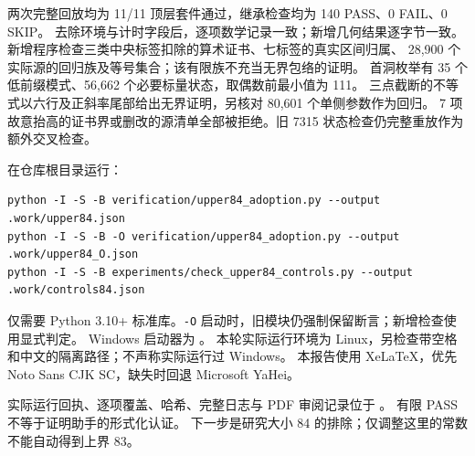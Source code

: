 \documentclass[11pt,a4paper]{article}
\begin{document}
两次完整回放均为 11/11 顶层套件通过，继承检查均为 140 PASS、0 FAIL、0 SKIP。
去除环境与计时字段后，逐项数学记录一致；新增几何结果逐字节一致。
新增程序检查三类中央标签扣除的算术证书、七标签的真实区间归属、
28,900 个实际源的回归族及等号集合；该有限族不充当无界包络的证明。
首洞枚举有 35 个低前缀模式、56,662 个必要标量状态，取偶数前最小值为 111。
三点截断的不等式以六行及正斜率尾部给出无界证明，另核对 80,601 个单侧参数作为回归。
7 项故意抬高的证书界或删改的源清单全部被拒绝。旧 7315 状态检查仍完整重放作为额外交叉检查。

在仓库根目录运行：
\begin{verbatim}
python -I -S -B verification/upper84_adoption.py --output .work/upper84.json
python -I -S -B -O verification/upper84_adoption.py --output .work/upper84_O.json
python -I -S -B experiments/check_upper84_controls.py --output .work/controls84.json
\end{verbatim}
仅需要 Python 3.10+ 标准库。\texttt{-O} 启动时，旧模块仍强制保留断言；新增检查使用显式判定。
Windows 启动器为 。
本轮实际运行环境为 Linux，另检查带空格和中文的隔离路径；不声称实际运行过 Windows。
本报告使用 XeLaTeX，优先 Noto Sans CJK SC，缺失时回退 Microsoft YaHei。

实际运行回执、逐项覆盖、哈希、完整日志与 PDF 审阅记录位于
。
有限 PASS 不等于证明助手的形式化认证。
下一步是研究大小 84 的排除；仅调整这里的常数不能自动得到上界 83。
\end{document}

